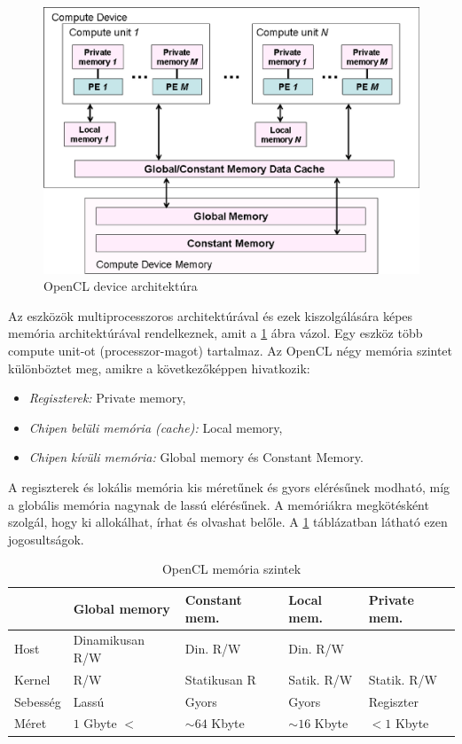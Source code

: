 	\begin{figure}[!h]
		\centering
		\includegraphics[width=0.6\columnwidth]{figures/eps/device.eps}
		\caption{OpenCL device architektúra \cite{opencl}} 
		\label{fig:device} 
	\end{figure}
	Az eszközök multiprocesszoros architektúrával és ezek kiszolgálására képes
	memória architektúrával rendelkeznek, amit a \ref{fig:device} ábra vázol.
	Egy eszköz több compute unit-ot (processzor-magot) tartalmaz.
	Az OpenCL négy memória szintet különböztet meg, amikre a
	következőképpen hivatkozik:
	\begin{itemize}
		\item \emph{Regiszterek:} Private memory,
		\item \emph{Chipen belüli memória (cache):} Local memory,
		\item \emph{Chipen kívüli memória:} Global memory és Constant Memory.
	\end{itemize}
	A regiszterek és lokális memória kis méretűnek és gyors elérésűnek modható, míg
	a globális memória nagynak de lassú elérésűnek.
	A memóriákra megkötésként szolgál, hogy ki allokálhat, írhat és olvashat
	belőle. A \ref{table:mem} táblázatban látható ezen jogosultságok.
	\begin{table}[!h]
	\caption{OpenCL memória szintek}
	\label{table:mem}
	\centering
	\begin{tabular}{l|l|l|l|l}
			 & Global memory & Constant mem. & Local mem. & Private mem.\\ \hline
		Host & Dinamikusan R/W & Din. R/W & Din. R/W & \\
		Kernel & R/W & Statikusan R & Satik. R/W & Statik. R/W\\
		Sebesség & Lassú & Gyors & Gyors & Regiszter\\
		Méret & $1$ Gbyte $<$ & $\sim64$ Kbyte& $\sim16$ Kbyte & $<1$ Kbyte
	\end{tabular}
	\end{table}
	
